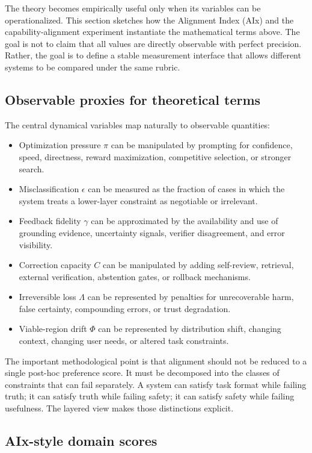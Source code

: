 \documentclass[11pt]{article}
\begin{document}
The theory becomes empirically useful only when its variables can be operationalized. This section sketches how the Alignment Index (AIx) and the capability-alignment experiment instantiate the mathematical terms above. The goal is not to claim that all values are directly observable with perfect precision. Rather, the goal is to define a stable measurement interface that allows different systems to be compared under the same rubric.

\subsection{Observable proxies for theoretical terms}

The central dynamical variables map naturally to observable quantities:
\begin{itemize}
    \item Optimization pressure \(\pi\) can be manipulated by prompting for confidence, speed, directness, reward maximization, competitive selection, or stronger search.
    \item Misclassification \(\epsilon\) can be measured as the fraction of cases in which the system treats a lower-layer constraint as negotiable or irrelevant.
    \item Feedback fidelity \(\gamma\) can be approximated by the availability and use of grounding evidence, uncertainty signals, verifier disagreement, and error visibility.
    \item Correction capacity \(C\) can be manipulated by adding self-review, retrieval, external verification, abstention gates, or rollback mechanisms.
    \item Irreversible loss \(\Lambda\) can be represented by penalties for unrecoverable harm, false certainty, compounding errors, or trust degradation.
    \item Viable-region drift \(\Phi\) can be represented by distribution shift, changing context, changing user needs, or altered task constraints.
\end{itemize}

The important methodological point is that alignment should not be reduced to a single post-hoc preference score. It must be decomposed into the classes of constraints that can fail separately. A system can satisfy task format while failing truth; it can satisfy truth while failing safety; it can satisfy safety while failing usefulness. The layered view makes those distinctions explicit.

\subsection{AIx-style domain scores}
\end{document}
